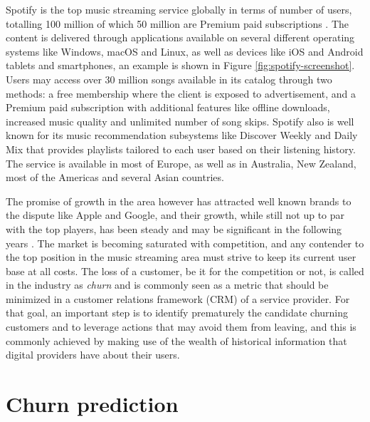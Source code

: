 \documentclass{kththesis}
\begin{document}
	Spotify is the top music streaming service globally in terms of number of users, totalling 100 million of which 50 million are Premium paid subscriptions \citep{spotifypress}. The content is delivered through applications available on several different operating systems like Windows, macOS and Linux, as well as devices like iOS and Android tablets and smartphones, an example is shown in Figure \ref{fig:spotify-screenshot}. Users may access over 30 million songs available in its catalog through two methods: a free membership where the client is exposed to advertisement, and a Premium paid subscription with additional features like offline downloads, increased music quality and unlimited number of song skips. Spotify also is well known for its music recommendation subsystems like Discover Weekly and Daily Mix that provides playlists tailored to each user based on their listening history. The service is available in most of Europe, as well as in Australia, New Zealand, most of the Americas and several Asian countries.	
	
	The promise of growth in the area however has attracted well known brands to the dispute like Apple and Google, and their growth, while still not up to par with the top players, has been steady and may be significant in the following years \citep{ifpi}. The market is becoming saturated with competition, and any contender to the top position in the music streaming area must strive to keep its current user base at all costs. The loss of a customer, be it for the competition or not, is called in the industry as \emph{churn} and is commonly seen as a metric that should be minimized in a customer relations framework (CRM) of a service provider. For that goal, an important step is to identify prematurely the candidate churning customers and to leverage actions that may avoid them from leaving, and this is commonly achieved by making use of the wealth of historical information that digital providers have about their users. 
	
\section{Churn prediction}	
	
\end{document}
